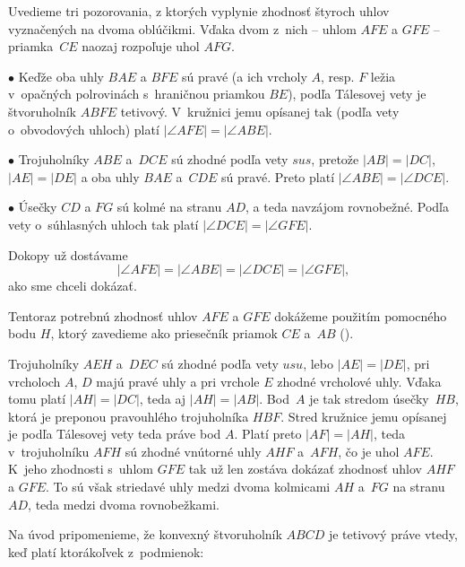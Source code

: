 {%
Uvedieme tri pozorovania, z ktorých vyplynie zhodnosť štyroch uhlov
vyznačených na \obr{} dvoma oblúčikmi. Vďaka dvom z~nich -- uhlom $AFE$ a $GFE$ -- priamka~$CE$ naozaj rozpoľuje uhol $AFG$.
%

\item{$\bullet$}
Keďže oba uhly $BAE$ a $BFE$ sú pravé (a ich vrcholy
$A$, resp. $F$ ležia v~opačných polrovinách s~hraničnou priamkou $BE$),
podľa Tálesovej vety je štvoruholník $ABFE$ tetivový.
V~kružnici jemu opísanej tak (podľa vety o~obvodových uhloch)
platí $|\angle AFE|=|\angle ABE|$.

\item{$\bullet$}
Trojuholníky $ABE$ a~$DCE$ sú zhodné podľa vety $sus$, pretože
$|AB|=|DC|$, $|AE|=|DE|$ a oba uhly $BAE$ a~$CDE$ sú pravé.
Preto platí $|\angle ABE|=|\angle DCE|$.

\item{$\bullet$}
Úsečky $CD$ a $FG$ sú kolmé na stranu $AD$, a teda navzájom
rovnobežné. Podľa vety o~súhlasných uhloch tak platí
$|\angle DCE|=|\angle GFE|$.

\smallskip\noindent
Dokopy už dostávame
$$
|\angle AFE|=|\angle ABE|=|\angle DCE|=|\angle GFE|,
$$
ako sme chceli dokázať.

\ineriesenie
Tentoraz potrebnú zhodnosť uhlov $AFE$ a $GFE$ dokážeme použitím pomocného
bodu $H$, ktorý zavedieme ako priesečník priamok $CE$ a~$AB$ (\obr).

Trojuholníky $AEH$ a~$DEC$ sú zhodné podľa vety $usu$,
lebo $|AE|=|DE|$, pri vrcholoch $A$, $D$ majú pravé uhly a
pri vrchole $E$ zhodné vrcholové uhly. Vďaka tomu platí
$|AH|=|DC|$, teda aj $|AH|=|AB|$. Bod~$A$ je tak stredom úsečky~$HB$,
ktorá je preponou
pravouhlého trojuholníka $HBF$. Stred kružnice jemu opísanej je
podľa Tálesovej vety teda práve bod $A$. Platí preto
$|AF|=|AH|$, teda v~trojuholníku $AFH$ sú zhodné vnútorné uhly
$AHF$ a~$AFH$, čo je uhol $AFE$. K~jeho zhodnosti s~uhlom
$GFE$ tak už len zostáva dokázať zhodnosť uhlov
$AHF$ a $GFE$. To sú však striedavé uhly
medzi dvoma kolmicami $AH$ a~$FG$ na stranu $AD$,
teda medzi dvoma rovnobežkami.
%

{\everypar{}
\smallskip
Na úvod pripomenieme, že konvexný štvoruholník $ABCD$ je tetivový práve vtedy, keď platí
ktorákoľvek z~podmienok:

}}
